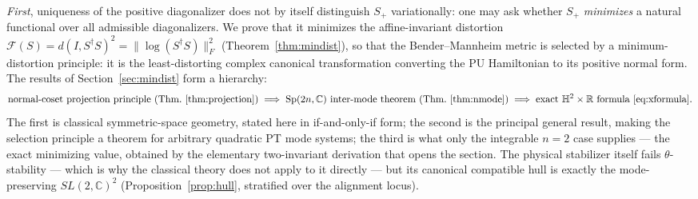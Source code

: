 \documentclass[11pt]{article}
\theoremstyle{definition}
\theoremstyle{remark}
\newcommand{\C}{\mathbb{C}}
\newcommand{\R}{\mathbb{R}}
\newcommand{\Sp}{\mathrm{Sp}}
\newcommand{\dg}{\dagger}
\begin{document}
\emph{First}, uniqueness of the positive diagonalizer does not by itself
distinguish $S_+$ variationally: one may ask whether $S_+$ \emph{minimizes} a
natural functional over all admissible diagonalizers.  We prove that it
minimizes the affine-invariant distortion
$\mathcal F(S)=d(I,S^{\dg}S)^2=\|\log(S^{\dg}S)\|_F^2$
(Theorem~\ref{thm:mindist}), so that the Bender--Mannheim metric is selected
by a minimum-distortion principle: it is the least-distorting complex
canonical transformation converting the PU Hamiltonian to its positive
normal form.  The results of Section~\ref{sec:mindist} form a hierarchy:
\begin{equation*}
\text{normal-coset projection principle (Thm.~\ref{thm:projection})}
\;\Longrightarrow\;
\Sp(2n,\C)\ \text{inter-mode theorem (Thm.~\ref{thm:nmode})}
\;\Longrightarrow\;
\text{exact }\mathbb H^2\times\R\ \text{formula \eqref{eq:xformula}} .
\end{equation*}
The first is classical symmetric-space geometry, stated here in
if-and-only-if form; the second is the principal general result, making the
selection principle a theorem for arbitrary quadratic PT mode systems; the
third is what only the integrable $n=2$ case supplies --- the exact
minimizing value, obtained by the elementary two-invariant derivation that
opens the section.  The physical stabilizer itself fails
$\theta$-stability --- which is why the classical theory does not apply to
it directly --- but its canonical compatible hull is exactly the
mode-preserving $SL(2,\C)^2$ (Proposition~\ref{prop:hull}, stratified over
the alignment locus).
\end{document}
